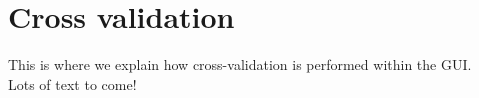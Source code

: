 
\chapter{Cross validation}
\minitoc

This is where we explain how cross-validation is performed within the GUI. \\
Lots of text to come!